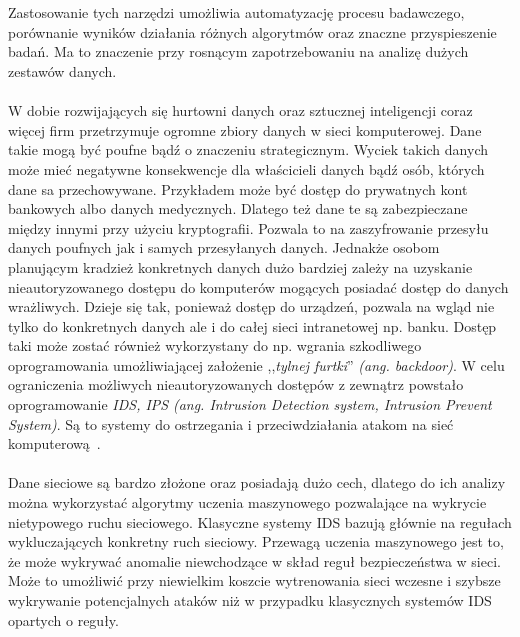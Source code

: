 \\ \\
Zastosowanie tych narzędzi umożliwia automatyzację procesu badawczego, porównanie wyników działania różnych algorytmów oraz znaczne przyspieszenie badań. Ma to znaczenie przy rosnącym zapotrzebowaniu na analizę dużych zestawów danych.
\\ \\
W dobie rozwijających się hurtowni danych oraz sztucznej inteligencji coraz więcej firm przetrzymuje ogromne zbiory danych w sieci komputerowej. Dane takie mogą być poufne bądź o znaczeniu strategicznym. Wyciek takich danych może mieć negatywne konsekwencje dla właścicieli danych bądź osób, których dane sa przechowywane. Przykładem może być dostęp do prywatnych kont bankowych albo danych medycznych. Dlatego też dane te są zabezpieczane między innymi przy użyciu kryptografii. Pozwala to na zaszyfrowanie przesyłu danych poufnych jak i samych przesyłanych danych. Jednakże osobom planującym kradzież konkretnych danych dużo bardziej zależy na uzyskanie nieautoryzowanego dostępu do komputerów mogących posiadać dostęp do danych wrażliwych. Dzieje się tak, ponieważ dostęp do urządzeń, pozwala na wgląd nie tylko do konkretnych danych ale i do całej sieci intranetowej np. banku. Dostęp taki może zostać również wykorzystany do np. wgrania szkodliwego oprogramowania umożliwiającej założenie ,,\textit{tylnej furtki}'' \textit{(ang. backdoor)}. W celu ograniczenia możliwych nieautoryzowanych dostępów z zewnątrz powstało oprogramowanie \textit{IDS, IPS} \textit{(ang. Intrusion Detection system, Intrusion Prevent System)}. Są to systemy do ostrzegania i przeciwdziałania atakom na sieć komputerową~\cite{Blyszcz2022}.
\\ \\
Dane sieciowe są bardzo złożone oraz posiadają dużo cech, dlatego do ich analizy można wykorzystać algorytmy uczenia maszynowego pozwalające na wykrycie nietypowego ruchu sieciowego. Klasyczne systemy IDS bazują głównie na regułach wykluczających konkretny ruch sieciowy. Przewagą uczenia maszynowego jest to, że może wykrywać anomalie niewchodzące w skład reguł bezpieczeństwa w sieci. Może to umożliwić przy niewielkim koszcie wytrenowania sieci wczesne i szybsze wykrywanie potencjalnych ataków niż w przypadku klasycznych systemów IDS opartych o reguły.

